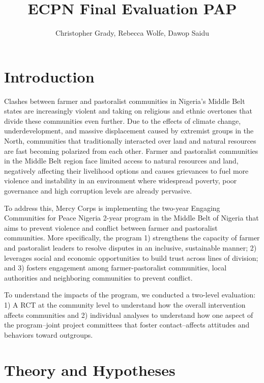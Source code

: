\documentclass[
]{article}
\title{ECPN Final Evaluation PAP}
\author{Christopher Grady, Rebecca Wolfe, Dawop Saidu}
\date{}
\begin{document}
\maketitle

\hypertarget{introduction}{%
\section{Introduction}\label{introduction}}

Clashes between farmer and pastoralist communities in Nigeria's Middle
Belt states are increasingly violent and taking on religious and ethnic
overtones that divide these communities even further. Due to the effects
of climate change, underdevelopment, and massive displacement caused by
extremist groups in the North, communities that traditionally interacted
over land and natural resources are fast becoming polarized from each
other. Farmer and pastoralist communities in the Middle Belt region face
limited access to natural resources and land, negatively affecting their
livelihood options and causes grievances to fuel more violence and
instability in an environment where widespread poverty, poor governance
and high corruption levels are already pervasive.

To address this, Mercy Corps is implementing the two-year Engaging
Communities for Peace Nigeria 2-year program in the Middle Belt of
Nigeria that aims to prevent violence and conflict between farmer and
pastoralist communities. More specifically, the program 1) strengthens
the capacity of farmer and pastoralist leaders to resolve disputes in an
inclusive, sustainable manner; 2) leverages social and economic
opportunities to build trust across lines of division; and 3) fosters
engagement among farmer-pastoralist communities, local authorities and
neighboring communities to prevent conflict.

To understand the impacts of the program, we conducted a two-level
evaluation: 1) A RCT at the community level to understand how the
overall intervention affects communities and 2) individual analyses to
understand how one aspect of the program--joint project committees that
foster contact--affects attitudes and behaviors toward outgroups.

\hypertarget{theory-and-hypotheses}{%
\section{Theory and Hypotheses}\label{theory-and-hypotheses}}
\end{document}
